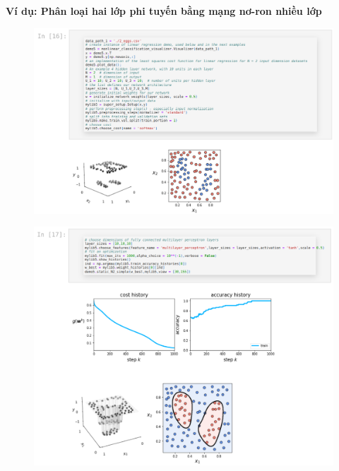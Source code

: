 \documentclass{book}
\begin{document}
    \textbf{Ví dụ: Phân loại hai lớp phi tuyến bằng mạng nơ-ron nhiều lớp}
    \begin{figure}[H]
        \centering
        \includegraphics[width=1.0\linewidth]{images/mau3.png}
        \label{fig:mau3}
    \end{figure}
    \begin{figure}[H]
        \centering
        \includegraphics[width=1.0\linewidth]{images/mau4.png}
        \label{fig:mau4}
    \end{figure}
\end{document}
